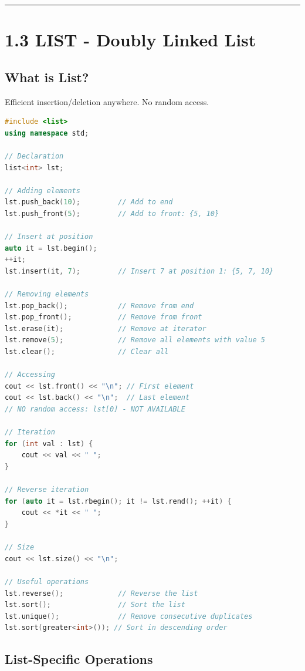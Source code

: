 \begin{center}\rule{0.5\linewidth}{0.5pt}\end{center}

\hypertarget{list---doubly-linked-list}{%
\section{1.3 LIST - Doubly Linked
List}\label{list---doubly-linked-list}}

\hypertarget{what-is-list}{%
\subsection{What is List?}\label{what-is-list}}

Efficient insertion/deletion anywhere. No random access.

\begin{lstlisting}[language={C++}]
#include <list>
using namespace std;

// Declaration
list<int> lst;

// Adding elements
lst.push_back(10);         // Add to end
lst.push_front(5);         // Add to front: {5, 10}

// Insert at position
auto it = lst.begin();
++it;
lst.insert(it, 7);         // Insert 7 at position 1: {5, 7, 10}

// Removing elements
lst.pop_back();            // Remove from end
lst.pop_front();           // Remove from front
lst.erase(it);             // Remove at iterator
lst.remove(5);             // Remove all elements with value 5
lst.clear();               // Clear all

// Accessing
cout << lst.front() << "\n"; // First element
cout << lst.back() << "\n";  // Last element
// NO random access: lst[0] - NOT AVAILABLE

// Iteration
for (int val : lst) {
    cout << val << " ";
}

// Reverse iteration
for (auto it = lst.rbegin(); it != lst.rend(); ++it) {
    cout << *it << " ";
}

// Size
cout << lst.size() << "\n";

// Useful operations
lst.reverse();             // Reverse the list
lst.sort();                // Sort the list
lst.unique();              // Remove consecutive duplicates
lst.sort(greater<int>()); // Sort in descending order
\end{lstlisting}

\hypertarget{list-specific-operations}{%
\subsection{List-Specific Operations}\label{list-specific-operations}}

